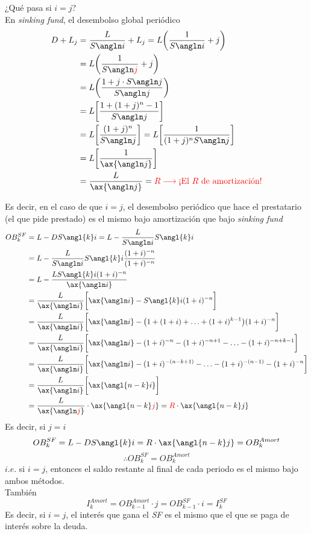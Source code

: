 ¿Qué pasa si $i=j$?\\
En \textit{sinking fund}, el desembolso global periódico
\begin{align*}
    D+ L_j &= \frac{L}{S\angln i} + L_j = L\bigg(\frac{1}{S\angln i} +j \bigg)\\
    &= L\bigg(\frac{1}{S\angln \textcolor{red}{j}} +j \bigg)\\
    &= L\bigg(\frac{1 + j\cdot S\angln j}{S\angln j} \bigg)\\
    &= L\bigg[\frac{1+ (1+j)^n - 1}{S\angln j}\bigg]\\
    &= L\bigg[\frac{(1+j)^n}{S\angln j}\bigg] = L \bigg[\frac{1}{(1+j)^n S\angln j}\bigg]\\
    &= L\bigg[\frac{1}{\ax{\angln j}}\bigg] \\
    &= \frac{L}{\ax{\angln j}} = \textcolor{red}{R \longrightarrow \text{¡El $R$ de amortización}!}
\end{align*}

Es decir, en el caso de que $i=j$, el desembolso periódico que hace el prestatario (el que pide prestado) es el mismo bajo amortización que bajo \textit{sinking fund}
\begin{align*}
    OB_k^{SF} &= L - DS\angl{k}i = L - \frac{L}{S\angln i}S\angl{k}i\\
    &= L - \frac{L}{S\angln i}S\angl{k}i \frac{(1+i)^{-n}}{(1+i)^{-n}}\\
    &= L - \frac{L S\angl{k}i (1+i)^{-n}}{\ax{\angln i}}\\
    &= \frac{L}{\ax{\angln i}}\bigg[\ax{\angln i} - S\angl{k}i (1+i)^{-n}\bigg]\\
    &= \frac{L}{\ax{\angln i}}\bigg[\ax{\angln i} - \big(1+(1+i)+\dotsc+(1+i)^{k-1}\big)(1+i)^{-n}\bigg]\\
    &= \frac{L}{\ax{\angln i}}\bigg[\ax{\angln i} - (1+i)^{-n} - (1+i)^{-n+1}-\dotsc-(1+i)^{-n+k-1}\bigg]\\
    &= \frac{L}{\ax{\angln i}}\bigg[\ax{\angln i} - (1+i)^{-(n-k+1)}-\dotsc- (1+i)^{-(n-1)}-(1+i)^{-n}\bigg]\\
    &= \frac{L}{\ax{\angln i}}\bigg[\ax{\angl{n-k}i}\bigg]\\
    &= \frac{L}{\ax{\angln \textcolor{red}{j}}}\cdot\ax{\angl{n-k}\textcolor{red}{j}} = \textcolor{red}{R}\cdot \ax{\angl{n-k}j}
\end{align*}
Es decir, si $j=i$
$$OB_k^{SF} = L -DS\angl{k}i = R\cdot\ax{\angl{n-k}j} = OB_k^{Amort}$$
$$\therefore OB_k^{SF} = OB_k^{Amort}$$
$i.e.$ si $i=j$, entonces el saldo restante al final de cada periodo es el mismo bajo ambos métodos.\\
También 
$$I_k^{Amort} = OB_{k-1}^{Amort}\cdot j = OB_{k-1}^{SF}\cdot i = I_k^{SF}$$
Es decir, si $i=j$, el interés que gana el \textit{SF} es el mismo que el que se paga de interés sobre la deuda.




